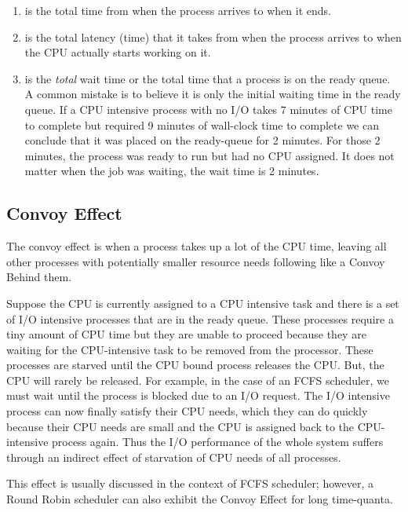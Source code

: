 \begin{enumerate}
\item {} is the total time from when the process arrives to when it ends.
  \item {} is the total latency (time) that it takes from when the process arrives to when the CPU actually starts working on it.
  \item {} is the \emph{total} wait time or the total time that a process is on the ready queue.
    A common mistake is to believe it is only the initial waiting time in the ready queue.
    If a CPU intensive process with no I/O takes 7 minutes of CPU time to complete but required 9 minutes of wall-clock time to complete we can conclude that it was placed on the ready-queue for 2 minutes.
    For those 2 minutes, the process was ready to run but had no CPU assigned.
    It does not matter when the job was waiting, the wait time is 2 minutes.

\end{enumerate}

\subsection{Convoy Effect}

The convoy effect is when a process takes up a lot of the CPU time, leaving all other processes with potentially smaller resource needs following like a Convoy Behind them.

Suppose the CPU is currently assigned to a CPU intensive task and there is a set of I/O intensive processes that are in the ready queue.
These processes require a tiny amount of CPU time but they are unable to proceed because they are waiting for the CPU-intensive task to be removed from the processor.
These processes are starved until the CPU bound process releases the CPU.
But, the CPU will rarely be released.
For example, in the case of an FCFS scheduler, we must wait until the process is blocked due to an I/O request.
The I/O intensive process can now finally satisfy their CPU needs, which they can do quickly because their CPU needs are small and the CPU is assigned back to the CPU-intensive process again.
Thus the I/O performance of the whole system suffers through an indirect effect of starvation of CPU needs of all processes.

This effect is usually discussed in the context of FCFS scheduler; however, a Round Robin scheduler can also exhibit the Convoy Effect for long time-quanta.

